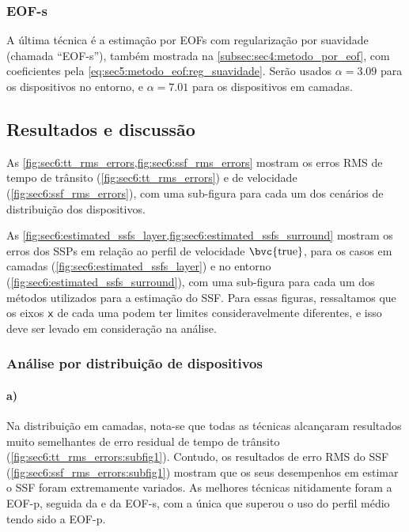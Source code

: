 \subsubsection*{EOF-s}

A última técnica é a estimação por EOFs com regularização por suavidade (chamada ``EOF-s''), também mostrada na \cref{subsec:sec4:metodo_por_eof}, com coeficientes pela \cref{eq:sec5:metodo_eof:reg_suavidade}. Serão usados $\alpha = 3.09$ para os dispositivos no entorno, e $\alpha = 7.01$ para os dispositivos em camadas.

\subsection{Resultados e discussão}





As \cref{fig:sec6:tt_rms_errors,fig:sec6:ssf_rms_errors} mostram os erros RMS de tempo de trânsito (\cref{fig:sec6:tt_rms_errors}) e de velocidade (\cref{fig:sec6:ssf_rms_errors}), com uma sub-figura para cada um dos cenários de distribuição dos dispositivos.

As \cref{fig:sec6:estimated_ssfs_layer,fig:sec6:estimated_ssfs_surround} mostram os erros dos SSPs em relação ao perfil de velocidade $\bvc{\true}$, para os casos em camadas (\cref{fig:sec6:estimated_ssfs_layer}) e no entorno (\cref{fig:sec6:estimated_ssfs_surround}), com uma sub-figura para cada um dos métodos utilizados para a estimação do SSF. Para essas figuras, ressaltamos que os eixos ${\textsf{x}}$ de cada uma podem ter limites consideravelmente diferentes, e isso deve ser levado em consideração na análise.

\subsubsection*{Análise por distribuição de dispositivos}

\paragraph{a)} Na distribuição em camadas, nota-se que todas as técnicas alcançaram resultados muito semelhantes de erro residual de tempo de trânsito (\cref{fig:sec6:tt_rms_errors:subfig1}). Contudo, os resultados de erro RMS do SSF (\cref{fig:sec6:ssf_rms_errors:subfig1}) mostram que os seus desempenhos em estimar o SSF foram extremamente variados. As melhores técnicas nitidamente foram a EOF-p, seguida da  e da EOF-s, com a única que superou o uso do perfil médio tendo sido a EOF-p.

